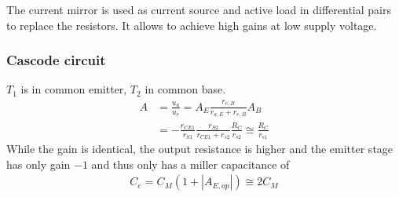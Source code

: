 The current mirror is used as current source and active load in differential pairs to replace the resistors. 
It allows to achieve high gains at low supply voltage.

\newpage
\subsubsection{Cascode circuit}
\begin{multicols}{2}
	\begin{center}
		
	\end{center}
	\vfill
	\columnbreak
	$T_1$ is in common emitter, $T_2$ in common base.
	\begin{align}
		A &= \frac{u_a}{u_e} = A_E \frac{r_{e,B}}{r_{a,E} + r_{e,B}} A_B \nonumber \\
		 &= -\frac{r_{CE1}}{r_{S1}} \frac{r_{S2}}{r_{CE1}+r_{s2}} \frac{R_C}{r_{s2}} \cong \frac{R_C}{r_{s1}}
	\end{align}
	While the gain is identical, the output resistance is higher and the emitter stage has only gain $-1$ and thus only has a miller capacitance of
	\begin{align}
		C_e = C_M \left( 1 + |A_{E,op}| \right) \cong 2 C_M
	\end{align}
\end{multicols}


